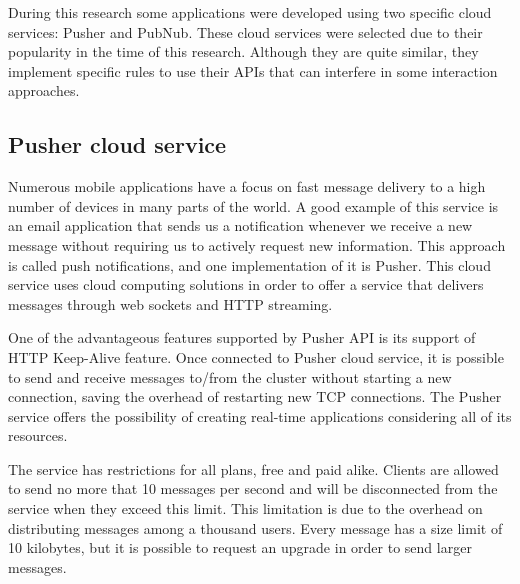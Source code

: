 During this research some applications were developed using two specific cloud services: Pusher and PubNub.
These cloud services were selected due to their popularity in the time of this research.
Although they are quite similar, they implement specific rules to use their APIs that can interfere in some interaction approaches.

\subsection*{Pusher cloud service}

Numerous mobile applications have a focus on fast message delivery to a high number of devices in many parts of the world.
A good example of this service is an email application that sends us a notification whenever we receive a new message without requiring us to actively request new information.
This approach is called push notifications, and one implementation of it is Pusher.
This cloud service uses cloud computing solutions in order to offer a service that delivers messages through web sockets and HTTP streaming.

One of the advantageous features supported by Pusher API is its support of HTTP Keep-Alive feature. 
Once connected to Pusher cloud service, it is possible to send and receive messages to/from the cluster without starting a new connection, saving the overhead of restarting new TCP connections.
The Pusher service offers the possibility of creating real-time applications considering all of its resources.


The service has restrictions for all plans, free and paid alike.
Clients are allowed to send no more that 10 messages per second and will be disconnected from the service when they exceed this limit.
This limitation is due to the overhead on distributing messages among a thousand users.
Every message has a size limit of 10 kilobytes, but it is possible to request an upgrade in order to send larger messages.

